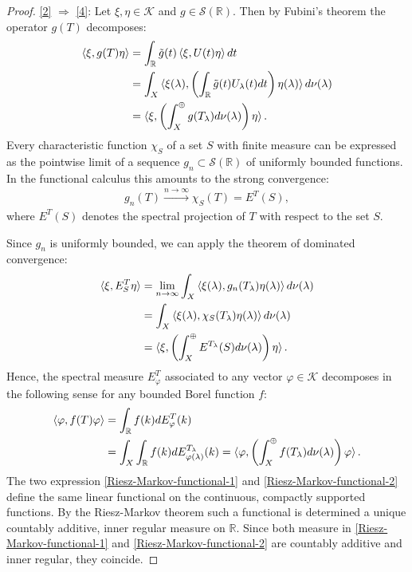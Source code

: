 \documentclass[12pt]{article}
\def\RR{{\mathbb R}}
\def\K{{\mathcal K}}
\def\l{\lambda}
\theoremstyle{remark}
\begin{document}
\begin{proof}
			\ref{2} $\Rightarrow$ \ref{4}:
				Let $\xi, \eta \in \K$ and $g\in \mathscr{S}(\RR)$. Then by Fubini's theorem the operator $g(T)$ decomposes:
			\begin{align*}
				\braket{\xi, g(T)\eta}
				&=\int_\RR \tilde{g}(t)\braket{\xi,U(t)\eta} dt\\
				&=\int_X \braket{\xi(\l),\left(\int_\RR \tilde{g}(t)U_\l(t)dt  \right)\eta(\l)} d\nu(\l)\\
				&=\braket{\xi,\left(\int^{\oplus}_X g(T_\l)d\nu(\l)  \right)\eta}.
			\end{align*}
			Every characteristic function $\chi_S$ of a set $S$ with finite measure can be expressed as the pointwise limit of a sequence $g_n\subset \mathscr{S}(\RR)$ of uniformly bounded functions. In the functional calculus this amounts to the strong convergence:
			\begin{align*}
				g_n(T)\xrightarrow{n\rightarrow \infty}\chi_{S}(T)=E^T(S),
			\end{align*}
			where $E^T(S)$ denotes the spectral projection of $T$ with respect to the set $S$.
			
			
			Since $g_n$ is uniformly bounded, we can apply the theorem of dominated convergence:
			\begin{align*}
				\braket{\xi,E^T_{S}\eta}&=\lim\limits_{n\rightarrow \infty}\int_X\braket{\xi(\l),g_n(T_\l)\eta(\l)}d\nu(\l)\\
				&=\int_X\braket{\xi(\l),\chi_{S}(T_\l)\eta(\l)}d\nu(\l)\\
				&=\braket{\xi,\left(\int^\oplus_X E^{T_\l}(S)d\nu(\l)\right)\eta}.
			\end{align*}
			Hence, the spectral measure $E_{\varphi}^{T}$ associated to any vector $\varphi \in \K$ decomposes in the following sense for any bounded Borel function $f$:
			\begin{align}
				\braket{\varphi,f(T)\varphi}&=\int_\RR f(k) dE_{\varphi}^T(k)\label{Riesz-Markov-functional-1}\\&=\int_X\int_\RR f(k) dE_{\varphi(\l)}^{T_\l}(k)
				=\braket{\varphi,\left(\int^\oplus_X f(T_\l)d\nu(\l)\right) \varphi}\label{Riesz-Markov-functional-2}.
			\end{align}
			The two expression \eqref{Riesz-Markov-functional-1} and \eqref{Riesz-Markov-functional-2} define the same linear functional on the continuous, compactly supported functions. By the Riesz-Markov theorem such a functional is determined a unique countably additive, inner regular measure on $\RR$. Since both measure in \eqref{Riesz-Markov-functional-1} and \eqref{Riesz-Markov-functional-2} are countably additive and inner regular, they coincide.
		\end{proof}
	
\end{document}
